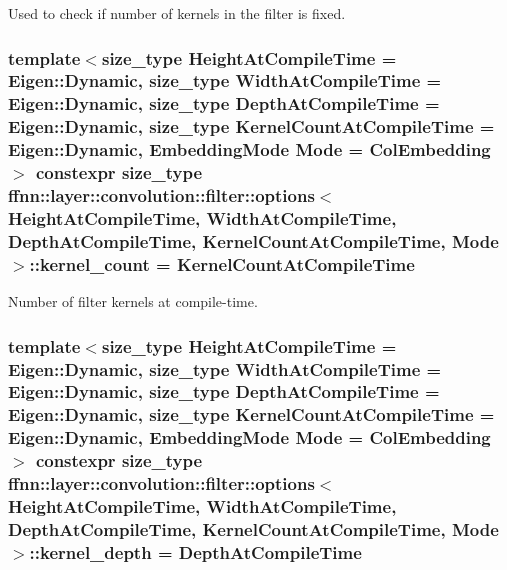 Used to check if number of kernels in the filter is fixed. 

\hypertarget{structffnn_1_1layer_1_1convolution_1_1filter_1_1options_a615d2970fd2d4ded6bbacff86d6f71e4}{
\subsubsection[{kernel\-\_\-count}]{\setlength{\rightskip}{0pt plus 5cm}template$<$size\-\_\-type Height\-At\-Compile\-Time = Eigen\-::\-Dynamic, size\-\_\-type Width\-At\-Compile\-Time = Eigen\-::\-Dynamic, size\-\_\-type Depth\-At\-Compile\-Time = Eigen\-::\-Dynamic, size\-\_\-type Kernel\-Count\-At\-Compile\-Time = Eigen\-::\-Dynamic, Embedding\-Mode Mode = Col\-Embedding$>$ constexpr {\bf size\-\_\-type} {\bf ffnn\-::layer\-::convolution\-::filter\-::options}$<$ Height\-At\-Compile\-Time, Width\-At\-Compile\-Time, Depth\-At\-Compile\-Time, Kernel\-Count\-At\-Compile\-Time, Mode $>$\-::kernel\-\_\-count = Kernel\-Count\-At\-Compile\-Time\hspace{0.3cm}{\ttfamily [static]}}}\label{structffnn_1_1layer_1_1convolution_1_1filter_1_1options_a615d2970fd2d4ded6bbacff86d6f71e4}


Number of filter kernels at compile-\/time. 

\hypertarget{structffnn_1_1layer_1_1convolution_1_1filter_1_1options_a699036320138871693bcd0ecfb977d6b}{
\subsubsection[{kernel\-\_\-depth}]{\setlength{\rightskip}{0pt plus 5cm}template$<$size\-\_\-type Height\-At\-Compile\-Time = Eigen\-::\-Dynamic, size\-\_\-type Width\-At\-Compile\-Time = Eigen\-::\-Dynamic, size\-\_\-type Depth\-At\-Compile\-Time = Eigen\-::\-Dynamic, size\-\_\-type Kernel\-Count\-At\-Compile\-Time = Eigen\-::\-Dynamic, Embedding\-Mode Mode = Col\-Embedding$>$ constexpr {\bf size\-\_\-type} {\bf ffnn\-::layer\-::convolution\-::filter\-::options}$<$ Height\-At\-Compile\-Time, Width\-At\-Compile\-Time, Depth\-At\-Compile\-Time, Kernel\-Count\-At\-Compile\-Time, Mode $>$\-::kernel\-\_\-depth = Depth\-At\-Compile\-Time\hspace{0.3cm}{\ttfamily [static]}}}\label{structffnn_1_1layer_1_1convolution_1_1filter_1_1options_a699036320138871693bcd0ecfb977d6b}


